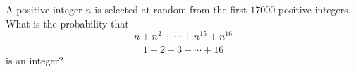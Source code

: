 A positive integer $n$ is selected at random from the first $17000$ positive integers. What is the probability that
\[\dfrac{n+n^2+\cdots+n^{15}+n^{16}}{1+2+3+\cdots+16}\]
is an integer?
